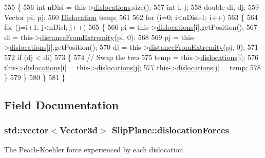\begin{DoxyCode}
555 \{
556   \textcolor{keywordtype}{int} nDisl = this->\hyperlink{classSlipPlane_ad92c7c409f7e161db449528389180910}{dislocations}.size();
557   \textcolor{keywordtype}{int} i, j;
558   \textcolor{keywordtype}{double} di, dj;
559   Vector pi, pj;
560   \hyperlink{classDislocation}{Dislocation} temp;
561 
562   \textcolor{keywordflow}{for} (i=0; i<nDisl-1; i++)
563     \{
564       \textcolor{keywordflow}{for} (j=i+1; j<nDisl; j++)
565         \{
566           pi = this->\hyperlink{classSlipPlane_ad92c7c409f7e161db449528389180910}{dislocations}[i].getPosition();
567           di = this->\hyperlink{classSlipPlane_a3523030cccb520b5253a811d062f3ddf}{distanceFromExtremity}(pi, 0);
568           
569           pj = this->\hyperlink{classSlipPlane_ad92c7c409f7e161db449528389180910}{dislocations}[j].getPosition();
570           dj = this->\hyperlink{classSlipPlane_a3523030cccb520b5253a811d062f3ddf}{distanceFromExtremity}(pj, 0);
571           
572           \textcolor{keywordflow}{if} (dj < di)
573             \{
574               \textcolor{comment}{// Swap the two}
575               temp = this->\hyperlink{classSlipPlane_ad92c7c409f7e161db449528389180910}{dislocations}[i];
576               this->\hyperlink{classSlipPlane_ad92c7c409f7e161db449528389180910}{dislocations}[i] = this->\hyperlink{classSlipPlane_ad92c7c409f7e161db449528389180910}{dislocations}[j];
577               this->\hyperlink{classSlipPlane_ad92c7c409f7e161db449528389180910}{dislocations}[j] = temp;
578             \}
579         \}
580     \}
581 \}
\end{DoxyCode}


\subsection{Field Documentation}
\hypertarget{classSlipPlane_a2a74ae1f66a59e53a3ca0c9b81b28f7d}{
\subsubsection[{dislocation\-Forces}]{\setlength{\rightskip}{0pt plus 5cm}std\-::vector$<${\bf Vector3d}$>$ Slip\-Plane\-::dislocation\-Forces\hspace{0.3cm}{\ttfamily [protected]}}}\label{db/d25/classSlipPlane_a2a74ae1f66a59e53a3ca0c9b81b28f7d}


The Peach-\/\-Koehler force experienced by each dislocation. 

